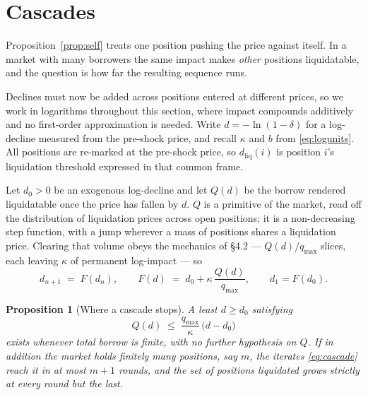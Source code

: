 \documentclass[11pt,a4paper]{article}
\theoremstyle{plain}
\newtheorem{proposition}{Proposition}
\theoremstyle{definition}
\theoremstyle{remark}
\begin{document}
\section{Cascades}\label{sec:cascade}

Proposition~\ref{prop:self} treats one position pushing the price against itself. In a market with
many borrowers the same impact makes \emph{other} positions liquidatable, and the question is how
far the resulting sequence runs.

Declines must now be added across positions entered at different prices, so we work in logarithms
throughout this section, where impact compounds additively and no first-order approximation is
needed. Write $d=-\ln(1-\delta)$ for a log-decline measured from the pre-shock price, and recall
$\kappa$ and $b$ from \eqref{eq:logunits}. All positions are re-marked at the pre-shock price, so
$d_{\mathrm{liq}}(i)$ is position $i$'s liquidation threshold expressed in that common frame.

Let $d_0>0$ be an exogenous log-decline and let $Q(d)$ be the borrow rendered liquidatable once
the price has fallen by $d$. $Q$ is a primitive of the market, read off the distribution of
liquidation prices across open positions; it is a non-decreasing step function, with a jump
wherever a mass of positions shares a liquidation price. Clearing that volume obeys the mechanics
of \S4.2 --- $Q(d)/q_{\max}$ slices, each leaving $\kappa$ of permanent log-impact --- so
\begin{equation}\label{eq:cascade}
  d_{n+1} \;=\; F(d_n), \qquad
  F(d) \;=\; d_0+\kappa\,\frac{Q(d)}{q_{\max}},
  \qquad d_1 = F(d_0).
\end{equation}

\begin{proposition}[Where a cascade stops]\label{prop:cascade}
A least $d\geq d_0$ satisfying
\begin{equation}\label{eq:secant}
  Q(d) \;\leq\; \frac{q_{\max}}{\kappa}\,\bigl(d-d_0\bigr)
\end{equation}
exists whenever total borrow is finite, with no further hypothesis on $Q$. If in addition the
market holds finitely many positions, say $m$, the iterates \eqref{eq:cascade} reach it in at most
$m+1$ rounds, and the set of positions liquidated grows strictly at every round but the last.
\end{proposition}
\end{document}
